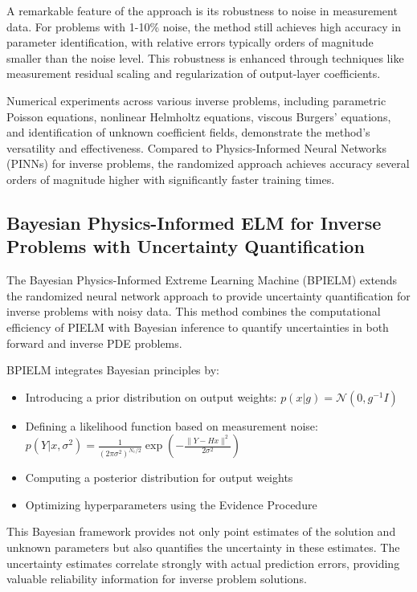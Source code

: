\documentclass[11pt]{article}
\begin{document}
A remarkable feature of the approach is its robustness to noise in measurement data. For problems with 1-10\% noise, the method still achieves high accuracy in parameter identification, with relative errors typically orders of magnitude smaller than the noise level. This robustness is enhanced through techniques like measurement residual scaling and regularization of output-layer coefficients.

Numerical experiments across various inverse problems, including parametric Poisson equations, nonlinear Helmholtz equations, viscous Burgers' equations, and identification of unknown coefficient fields, demonstrate the method's versatility and effectiveness. Compared to Physics-Informed Neural Networks (PINNs) for inverse problems, the randomized approach achieves accuracy several orders of magnitude higher with significantly faster training times.

\subsection{Bayesian Physics-Informed ELM for Inverse Problems with Uncertainty Quantification}

The Bayesian Physics-Informed Extreme Learning Machine (BPIELM) \citep{Liu2023} extends the randomized neural network approach to provide uncertainty quantification for inverse problems with noisy data. This method combines the computational efficiency of PIELM with Bayesian inference to quantify uncertainties in both forward and inverse PDE problems.

BPIELM integrates Bayesian principles by:
\begin{itemize}
    \item Introducing a prior distribution on output weights: $p(x|g) = \mathcal{N}(0, g^{-1}I)$
    \item Defining a likelihood function based on measurement noise: $p(Y|x,\sigma^2) = \frac{1}{(2\pi\sigma^2)^{N_c/2}} \exp\left(-\frac{\|Y-Hx\|^2}{2\sigma^2}\right)$
    \item Computing a posterior distribution for output weights
    \item Optimizing hyperparameters using the Evidence Procedure
\end{itemize}

This Bayesian framework provides not only point estimates of the solution and unknown parameters but also quantifies the uncertainty in these estimates. The uncertainty estimates correlate strongly with actual prediction errors, providing valuable reliability information for inverse problem solutions.
\end{document}
